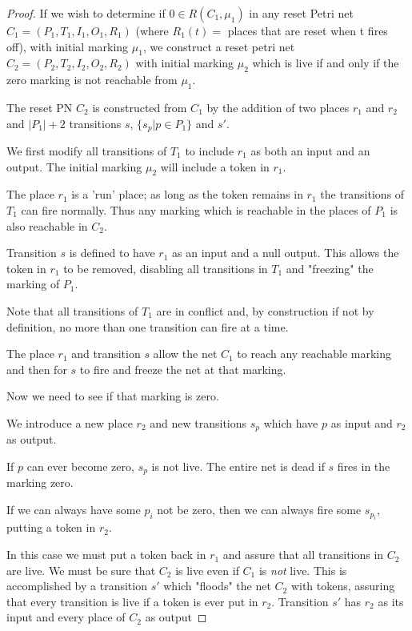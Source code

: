 \iffalse
\begin{proof}
If we wish to determine if $0 \in R(C_1, \mu_1)$ in any
reset Petri net $C_1 = (P_1, T_1, I_1, O_1, R_1 )$ (where $R_1(t) =$ places that are reset when t fires off), with initial marking $\mu_1$, we construct a
reset petri net $C_2 = (P_2, T_2, I_2, O_2, R_2 )$ with initial marking
$\mu_2$ which is live if and only if the zero marking is not reachable from $\mu_1$.

The reset PN $C_2$ is constructed from $C_1$ by the addition of two places $r_1$ and $r_2$
and $|P_1| +2$ transitions $s$, $\{ s_p | p \in P_1 \}$ and $s'$.

We first modify all transitions of $T_1$ to include $r_1$ as both an input and an output.
The initial marking $\mu_2$ will include a token in $r_1$. 


The place $r_1$ is a 'run' place; as long as the token remains in $r_1$ the transitions of $T_1$ can fire normally.
Thus any marking which is reachable in the places of $P_1$ is also reachable in $C_2$.



Transition $s$ is defined to have $r_1$ as an input and a null output.
This allows the token in $r_1$ to be removed, disabling all transitions in $T_1$
and "freezing" the marking of $P_1$.

Note that all transitions of $T_1$ are in conflict and, by construction if not by definition, no more than one transition can fire at a time.

The place $r_1$ and transition $s$ allow the net $C_1$ to reach any reachable marking and then for $s$ to fire and freeze the net at that marking.

Now we need to see if that marking is zero.

We introduce a new place $r_2$ and new transitions $s_p$ which have $p$ as input and $r_2$ as output.

If $p$ can ever become zero, $s_p$ is not live. The entire net is dead if
$s$ fires in the marking zero.

If we can always have some $p_i$ not be zero, then we can always fire some $s_{p_i}$, putting a token in $r_2$.

In this case we must put a token back in $r_1$ and assure that all transitions in $C_2$ are live.
We must be sure that $C_2$ is live even if $C_1$ is {\em not} live.
This is accomplished by a transition $s'$ which  "floods" the net $C_2$ with tokens, assuring that every transition is live if a token is ever put in $r_2$.
Transition $s'$ has $r_2$ as its input and every place of $C_2$ as output


\end{proof}
